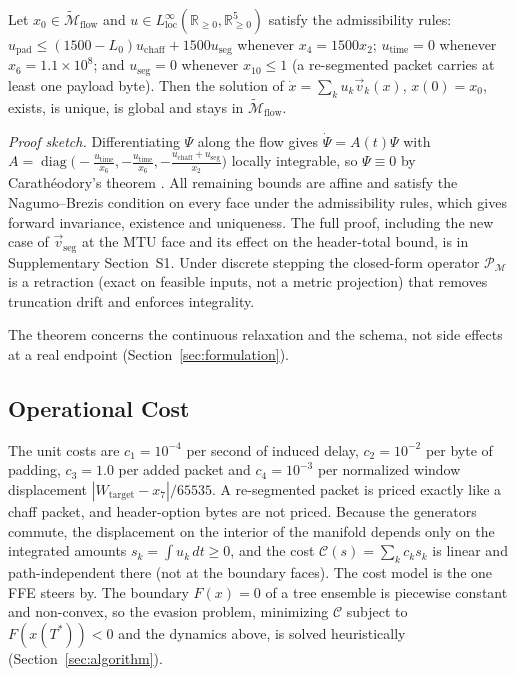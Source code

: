 \begin{theorem}
\label{thm:invariant_universal}
Let $x_0\in\widetilde{\mathcal{M}}_{\text{flow}}$ and $u\in L^\infty_{\text{loc}}(\mathbb{R}_{\ge0},\mathbb{R}^5_{\ge0})$ satisfy the admissibility rules: $u_{\text{pad}}\le(1500-L_0)u_{\text{chaff}}+1500u_{\text{seg}}$ whenever $x_4=1500x_2$; $u_{\text{time}}=0$ whenever $x_6=1.1\times10^8$; and $u_{\text{seg}}=0$ whenever $x_{10}\le1$ (a re-segmented packet carries at least one payload byte). Then the solution of $\dot x=\sum_ku_k\vec v_k(x)$, $x(0)=x_0$, exists, is unique, is global and stays in $\widetilde{\mathcal{M}}_{\text{flow}}$.
\end{theorem}
\noindent\textit{Proof sketch.} Differentiating $\Psi$ along the flow gives $\dot\Psi=A(t)\Psi$ with $A=\operatorname{diag}\!\big(-\tfrac{u_{\text{time}}}{x_6},-\tfrac{u_{\text{time}}}{x_6},-\tfrac{u_{\text{chaff}}+u_{\text{seg}}}{x_2}\big)$ locally integrable, so $\Psi\equiv0$ by Carath\'eodory's theorem \cite{caratheodory1918vorlesungen}. All remaining bounds are affine and satisfy the Nagumo--Brezis condition \cite{nagumo1942lage, brezis1970characterization} on every face under the admissibility rules, which gives forward invariance, existence and uniqueness. The full proof, including the new case of $\vec v_{\text{seg}}$ at the MTU face and its effect on the header-total bound, is in Supplementary Section~S1. Under discrete stepping the closed-form operator $\mathcal{P}_{\mathcal{M}}$ is a retraction (exact on feasible inputs, not a metric projection) that removes truncation drift and enforces integrality.

The theorem concerns the continuous relaxation and the schema, not side effects at a real endpoint (Section~\ref{sec:formulation}).

\subsection{Operational Cost}
\label{sec:cost}

The unit costs are $c_1=10^{-4}$ per second of induced delay, $c_2=10^{-2}$ per byte of padding, $c_3=1.0$ per added packet and $c_4=10^{-3}$ per normalized window displacement $|W_{\text{target}}-x_7|/65535$. A re-segmented packet is priced exactly like a chaff packet, and header-option bytes are not priced. Because the generators commute, the displacement on the interior of the manifold depends only on the integrated amounts $s_k=\int u_k\,dt\ge0$, and the cost $\mathcal{C}(s)=\sum_kc_ks_k$ is linear and path-independent there (not at the boundary faces). The cost model is the one FFE steers by. The boundary $F(x)=0$ of a tree ensemble is piecewise constant and non-convex, so the evasion problem, minimizing $\mathcal{C}$ subject to $F(x(T^*))<0$ and the dynamics above, is solved heuristically (Section~\ref{sec:algorithm}).
